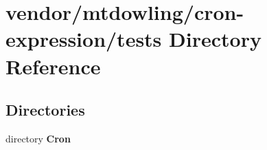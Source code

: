 \section{vendor/mtdowling/cron-\/expression/tests Directory Reference}
\label{dir_57da337c21b57614812b50788776d68a}
\subsection*{Directories}
\begin{DoxyCompactItemize}
\item 
directory {\bf Cron}
\end{DoxyCompactItemize}
